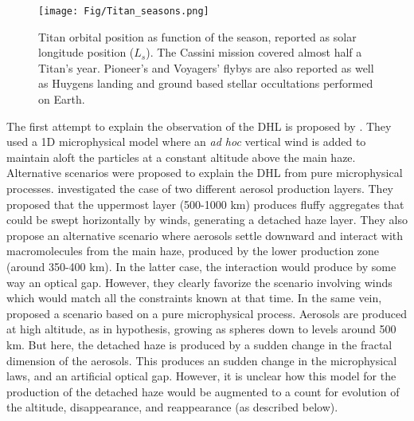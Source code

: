 \begin{figure}[!ht]
    \centering
    \texttt{[image: Fig/Titan\_seasons.png]}  %
    \caption{Titan orbital position as function of the season, reported as solar longitude position ($L_s$).
             The Cassini mission covered almost half a Titan's year. Pioneer's and Voyagers' flybys are also reported
             as well as Huygens landing and ground based stellar occultations performed on Earth.}
    \label{fig:titan_seasons}
\end{figure}

The first attempt to explain the observation of the DHL is proposed by \cite{Toon1992}. They used a 1D microphysical
model where an \emph{ad hoc} vertical wind is added to maintain aloft the particles at a constant altitude above the main
haze. Alternative scenarios were proposed to explain the DHL from pure microphysical processes. \cite{Chassefiere1995}
investigated the case of two different aerosol production layers. They proposed that the uppermost layer (500-1000 km)
produces fluffy aggregates that could be swept horizontally by winds, generating a detached haze layer. They also
propose an alternative scenario where aerosols settle downward and interact with macromolecules from the main haze,
produced by the lower production zone (around 350-400 km). In the latter case, the interaction would produce by some
way an optical gap. However, they clearly favorize the scenario involving winds which would match all the constraints
known at that time. In the same vein, \cite{Lavvas2009} proposed a scenario based on a pure microphysical process. Aerosols
are produced at high altitude, as in \cite{Chassefiere1995} hypothesis, growing as spheres down to levels around 500 km.
But here, the detached haze is produced by a sudden change in the fractal dimension of the aerosols. This produces an
sudden change in the microphysical laws, and an artificial optical gap. However, it is unclear how this model for the
production of the detached haze would be augmented to a count for evolution of the altitude, disappearance,
and reappearance (as described below).

